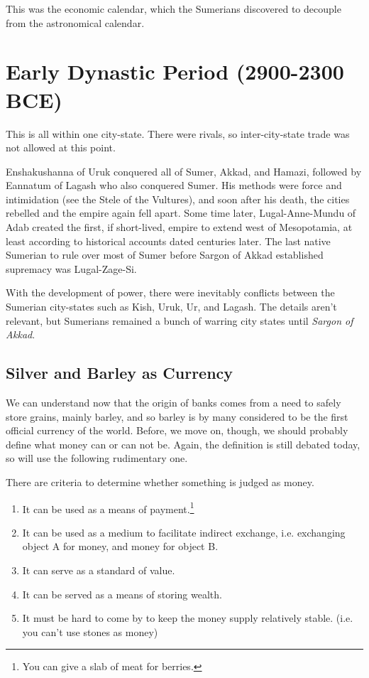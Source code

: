\documentclass{article}
\begin{document}
    This was the economic calendar, which the Sumerians discovered to decouple from the astronomical calendar. 

\section{Early Dynastic Period (2900-2300 BCE)}

  This is all within one city-state. There were rivals, so inter-city-state trade was not allowed at this point. 

  Enshakushanna of Uruk conquered all of Sumer, Akkad, and Hamazi, followed by Eannatum of Lagash who also conquered Sumer. His methods were force and intimidation (see the Stele of the Vultures), and soon after his death, the cities rebelled and the empire again fell apart. Some time later, Lugal-Anne-Mundu of Adab created the first, if short-lived, empire to extend west of Mesopotamia, at least according to historical accounts dated centuries later. The last native Sumerian to rule over most of Sumer before Sargon of Akkad established supremacy was Lugal-Zage-Si. 

  With the development of power, there were inevitably conflicts between the Sumerian city-states such as Kish, Uruk, Ur, and Lagash. The details aren't relevant, but Sumerians remained a bunch of warring city states until \textit{Sargon of Akkad}. 

  \subsection{Silver and Barley as Currency}

    We can understand now that the origin of banks comes from a need to safely store grains, mainly barley, and so barley is by many considered to be the first official currency of the world. Before, we move on, though, we should probably define what money can or can not be. Again, the definition is still debated today, so will use the following rudimentary one.

    \begin{definition}[Money]
      \label{def:money}
      There are criteria to determine whether something is judged as money. 
      \begin{enumerate}
        \item It can be used as a means of payment.\footnote{You can give a slab of meat for berries. } 
        \item It can be used as a medium to facilitate indirect exchange, i.e. exchanging object A for money, and money for object B. 
        \item It can serve as a standard of value. 
        \item It can be served as a means of storing wealth. 
        \item It must be hard to come by to keep the money supply relatively stable. (i.e. you can't use stones as money)
      \end{enumerate}
    \end{definition}
\end{document}
